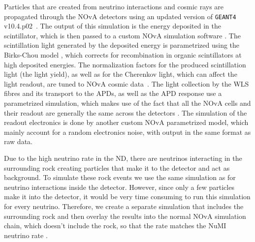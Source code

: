 Particles that are created from neutrino interactions and cosmic rays are propagated through the \gls{NOvA} detectors using an updated version of \texttt{GEANT4} v10.4.p02~\cite{GEANT4.pdf}. The output of this simulation is the energy deposited in the scintillator, which is then passed to a custom \gls{NOvA} simulation software \cite{NuMIFlux.pdf}. The scintillation light generated by the deposited energy is parametrized using the Birks-Chou model \cite{BirksChouParametrization_1952.pdf}, which corrects for recombination in organic scintillators at high deposited energies. The normalization factors for the produced scintillation light (the light yield), as well as for the Cherenkov light, which can affect the light readout, are tuned to \gls{NOvA} cosmic data~\cite{NOvANumuCCXSexMeasurement2023.pdf}. The light collection by the \gls{WLS} fibres and its transport to the \gls{APD}s, as well as the \gls{APD} response use a parametrized simulation, which makes use of the fact that all the \gls{NOvA} cells and their readout are generally the same across the detectors \cite{NuMIFlux.pdf}. The simulation of the readout electronics is done by another custom \gls{NOvA} parametrized model, which mainly account for a random electronics noise, with output in the same format as raw data.


Due to the high neutrino rate in the \gls{ND}, there are neutrinos interacting in the surrounding rock creating particles that make it to the detector and act as background. To simulate these rock events we use the same simulation as for neutrino interactions inside the detector. However, since only a few particles make it into the detector, it would be very time consuming to run this simulation for every neutrino. Therefore, we create a separate simulation that includes the surrounding rock and then overlay the results into the normal \gls{NOvA} simulation chain, which doesn't include the rock, so that the rate matches the \gls{NuMI} neutrino rate \cite{NuMIFlux.pdf}.

